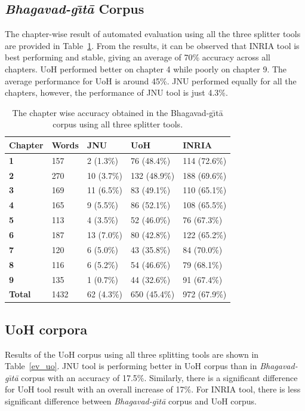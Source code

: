 \documentclass[11pt]{article}
\begin{document}
\subsection{\textit{Bhagavad-g\={\i}t\={a}} Corpus}
The chapter-wise result of automated evaluation using all the three splitter tools are provided in Table~\ref{ev_bg}. From the results, it can be observed that INRIA tool is best performing and stable, giving an average of 70\% accuracy across all chapters. UoH performed better on chapter 4 while poorly on chapter 9. The average performance for UoH is around 45\%. JNU performed equally for all the chapters, however, the performance of JNU tool is just 4.3\%.

\begin{table}[t]
	\begin{center}
		\begin{tabular}{|p{1.2cm} | p{1cm}|p{1cm} | p{1.2cm} | p{1.2cm}|}
			\hline 
			\bf Chapter & \bf Words & \bf JNU & \bf UoH & \bf INRIA \\ 
			\hline
			
			\bf	1	&	157	&	2	(1.3\%)	&	76	(48.4\%)	&	114	(72.6\%)	\\	\hline
			\bf	2	&	270	&	10	(3.7\%)	&	132	(48.9\%)	&	188	(69.6\%)	\\	\hline
			\bf	3	&	169	&	11	(6.5\%)	&	83	(49.1\%)	&	110	(65.1\%)	\\	\hline
			\bf	4	&	165	&	9	(5.5\%)	&	86	(52.1\%)	&	108	(65.5\%)	\\	\hline
			\bf	5	&	113	&	4	(3.5\%)	&	52	(46.0\%)	&	76	(67.3\%)	\\	\hline
			\bf	6	&	187	&	13	(7.0\%)	&	80	(42.8\%)	&	122	(65.2\%)	\\	\hline
			\bf	7	&	120	&	6	(5.0\%)	&	43	(35.8\%)	&	84	(70.0\%)	\\	\hline
			\bf	8	&	116	&	6	(5.2\%)	&	54	(46.6\%)	&	79	(68.1\%)	\\	\hline
			\bf	9	&	135	&	1	(0.7\%)	&	44	(32.6\%)	&	91	(67.4\%)	\\	\hline
			\bf	Total	&	1432	&	62	(4.3\%)	&	650	(45.4\%)	&	972	(67.9\%)	\\	\hline
			
		\end{tabular}
	\end{center}
	\caption{\label{ev_bg} The chapter wise accuracy obtained in the Bhagavad-g\={\i}t\={a} corpus using all three splitter tools.}
\end{table} 

\subsection{UoH corpora}
Results of the UoH corpus using all three splitting tools are shown in Table~\ref{ev_uo}. JNU tool is performing better in UoH corpus than in \textit{Bhagavad-g\={\i}t\={a}} corpus with an accuracy of 17.5\%. Similarly, there is a significant difference for UoH tool result with an overall increase of 17\%.
For INRIA tool, there is less significant difference between \textit{Bhagavad-g\={\i}t\={a}} corpus and UoH corpus.
\end{document}

